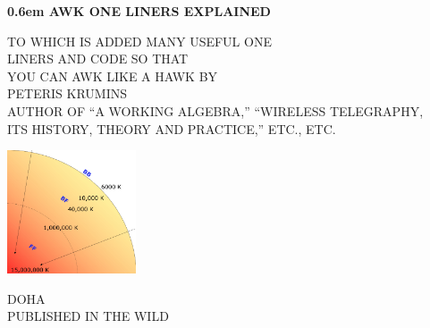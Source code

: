 \clearpage
\newcommand\nbvspace[1][3]{\vspace*{\stretch{#1}}}
\newcommand\nbstretchyspace{\spaceskip0.5em plus 0.25em minus 0.25em}
\newcommand{\nbtitlestretch}{\spaceskip0.6em}
\pagestyle{empty}
\begin{center}
\bfseries
\nbvspace[1]
\Huge
{\nbtitlestretch\huge
AWK ONE LINERS EXPLAINED}

\nbvspace[1]
\normalsize

TO WHICH IS ADDED MANY USEFUL ONE\\
LINERS AND CODE SO THAT\\
YOU CAN AWK LIKE A HAWK
\nbvspace[1]
\small BY\\
\Large PETERIS KRUMINS\\[0.5em]
\footnotesize AUTHOR OF ``A WORKING ALGEBRA,'' ``WIRELESS TELEGRAPHY,\\
ITS HISTORY, THEORY AND PRACTICE,'' ETC., ETC.

\nbvspace[2]

\includegraphics[width=1.5in]{immagini/assorbimenti-stella.png}
\nbvspace[3]
\normalsize

DOHA\\
\large
PUBLISHED IN THE WILD
\nbvspace[1]
\end{center}